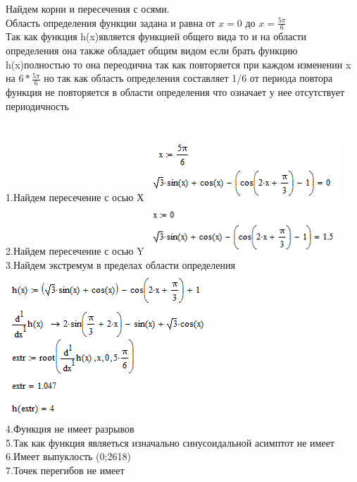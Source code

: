 \documentclass[russian,utf8,nocolumxxxi,nocolumnxxxii]{eskdtext}
\begin{document}
\newpage
{}

Найдем корни и пересечения с осями.
\\Область определения функции задана и равна от $x=0$ до $x=\frac{5\pi}{6}$
\\Так как функция h(x)является функцией общего вида то и на области определения она также обладает общим видом если брать функцию h(x)полностью то она переодична так как повторяется при каждом изменении x на $6*\frac {5\pi}{6}$ но так как область определения составляет 1/6 от периода повтора функция не повторяется в области определения что означает у нее отсутствует периодичность
\par
\normalsize
\\1.Найдем пересечение с осью Х
\includegraphics[scale=0.70]{3}
\\2.Найдем пересечение с осью Y
\includegraphics[scale=0.70]{4}
\newpage
\\3.Найдем экстремум в пределах области определения
\\\includegraphics[scale=0.8]{5}
\\4.Функция не имеет разрывов 
\\5.Так как функция являеться изначально синусоидальной асимптот не имеет
\\6.Имеет выпуклость (0;2618)
\\7.Точек перегибов не имеет
\end{document}
